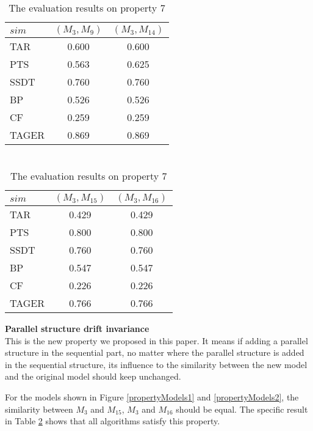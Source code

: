 \documentclass{llncs}
\begin{document}
\begin{table}[!htb]
\begin{minipage}[t]{0.5\linewidth} 
\centering 
\caption{\protect\\ The evaluation results  on property 6}
\label{result_property6}
\begin{tabular}{l c c} \hline
 $sim$  & $(M_{3},M_{9})$ & $(M_{3},M_{14})$  \\ \hline
 TAR & 0.600 & 0.600 \\ 
 PTS & 0.563 & 0.625  \\ 
 SSDT& 0.760 & 0.760 \\ 
 BP& 0.526 & 0.526 \\ 
 CF& 0.259 & 0.259 \\ 
 TAGER& 0.869 & 0.869 \\ \hline
\end{tabular}
\end{minipage}
\begin{minipage}[t]{0.5\linewidth} 
\centering
\caption{\protect\\ The evaluation results on property 7}
 \label{result_property7}
\begin{tabular}{l c c} \hline
 $sim$  & $(M_{3},M_{15})$ & $(M_{3},M_{16})$  \\ \hline
 TAR & 0.429 & 0.429 \\ 
 PTS & 0.800 & 0.800  \\ 
 SSDT& 0.760 & 0.760 \\ 
 BP& 0.547 & 0.547 \\ 
 CF& 0.226 & 0.226 \\ 
 TAGER& 0.766 & 0.766 \\ \hline
\end{tabular}
\end{minipage}
\end{table}

\begin{property}
\textbf{Parallel structure drift invariance}\\ 
This is the new property we proposed in this paper. It means if adding a parallel structure in the sequential part, no matter where the parallel structure is added in the sequential structure, its influence to the similarity between the new model and the original model should keep unchanged.
\end{property} 
For the models shown in Figure \ref{propertyModels1} and \ref{propertyModels2},  the similarity between $M_{3}$ and $M_{15}$, $M_{3}$ and $M_{16}$  should be equal. The specific result in Table \ref{result_property7} shows that all algorithms satisfy this property.
\end{document}
